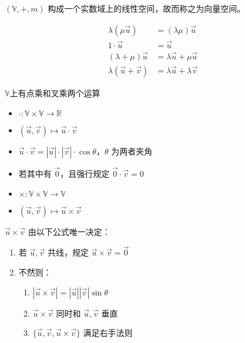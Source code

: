 \documentclass[lang=cn,10pt,thmcnt=section]{elegantbook}
\begin{document}
\begin{proposition}
    $(\mathbb{V}, +, m)$ 构成一个实数域上的线性空间，故而称之为向量空间。

    \begin{equation*}
        \begin{split}
            \lambda (\mu \vec{u}) &= (\lambda \mu) \vec{u}\\
            1 \cdot \vec{u} &= \vec{u}\\  
            (\lambda + \mu) \vec{u} &= \lambda \vec{u} + \mu \vec{u}\\
            \lambda (\vec{u} + \vec{v})& = \lambda \vec{u} + \lambda \vec{v}
        \end{split}
     \end{equation*}
\end{proposition}
    
 $\mathbb{V}$上有点乘和叉乘两个运算

\begin{definition}[点积]
    \begin{itemize}
        \item $\cdot : \mathbb{V} \times \mathbb{V} \rightarrow \mathbb{R}$
        \item $(\vec{u}, \vec{v}) \mapsto \vec{u} \cdot \vec{v}$
        \item $\vec{u} \cdot \vec{v} = |\vec{u}| \cdot |\vec{v}| \cdot \cos \theta$，$\theta$ 为两者夹角
        \item 若其中有 $\vec{0}$，且强行规定 $\vec{0} \cdot \vec{v} = 0$
    \end{itemize}
\end{definition}

\begin{definition}[叉积]
    \begin{itemize}
        \item $\times : \mathbb{V} \times \mathbb{V} \rightarrow \mathbb{V}$
        \item $(\vec{u}, \vec{v}) \mapsto \vec{u} \times \vec{v}$
    \end{itemize}
    
    $\vec{u} \times \vec{v}$ 由以下公式唯一决定：
    \begin{enumerate}
        \item 若 $\vec{u}, \vec{v}$ 共线，规定 $\vec{u} \times \vec{v} = \vec{0}$
        \item 不然则：
        \begin{enumerate}
            \item $|\vec{u} \times \vec{v}| = |\vec{u}| |\vec{v}| \sin \theta$
            \item $\vec{u} \times \vec{v}$ 同时和 $\vec{u}, \vec{v}$ 垂直
            \item $\{\vec{u}, \vec{v}, \vec{u} \times \vec{v}\}$ 满足右手法则
        \end{enumerate}
    \end{enumerate}

\end{definition}
\end{document}
